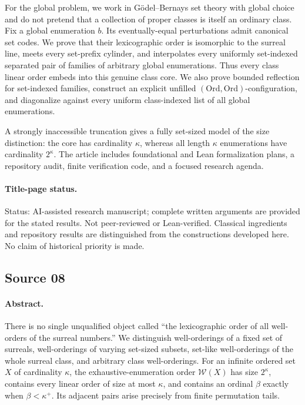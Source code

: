 \documentclass[11pt]{article}
\theoremstyle{definition}
\theoremstyle{remark}
\newcommand{\Ord}{\mathrm{Ord}}
\newcommand{\W}{\mathcal W}
\begin{document}
For the global problem, we work in G\"odel--Bernays set theory with global
choice and do not pretend that a collection of proper classes is itself an
ordinary class. Fix a global enumeration $b$. Its eventually-equal
perturbations admit canonical set codes. We prove that their lexicographic
order is isomorphic to the surreal line, meets every set-prefix cylinder,
and interpolates every uniformly set-indexed separated pair of families
of arbitrary global enumerations. Thus every class linear order embeds
into this genuine class core. We also prove bounded reflection for
set-indexed families, construct an explicit unfilled
$(\Ord,\Ord)$-configuration, and diagonalize against every uniform
class-indexed list of all global enumerations.

A strongly inaccessible truncation gives a fully set-sized model of the
size distinction: the core has cardinality $\kappa$, whereas all length
$\kappa$ enumerations have cardinality $2^\kappa$. The article includes
foundational and Lean formalization plans, a repository audit, finite
verification code, and a focused research agenda.


\paragraph{Title-page status.}

{\small\color{Gray}\noindent
Status: AI-assisted research manuscript; complete written arguments are
provided for the stated results. Not peer-reviewed or Lean-verified.
Classical ingredients and repository results are distinguished from the
constructions developed here. No claim of historical priority is made.}


\subsection*{Source 08}
\paragraph{Abstract.}

There is no single unqualified object called ``the lexicographic order of
all well-orders of the surreal numbers.'' We distinguish well-orderings of
a fixed set of surreals, well-orderings of varying set-sized subsets,
set-like well-orderings of the whole surreal class, and arbitrary class
well-orderings. For an infinite ordered set $X$ of cardinality $\kappa$, the
exhaustive-enumeration order $\W(X)$ has size $2^\kappa$, contains every
linear order of size at most $\kappa$, and contains an ordinal $\beta$
exactly when $\beta<\kappa^+$. Its adjacent pairs arise precisely from
finite permutation tails.
\end{document}

